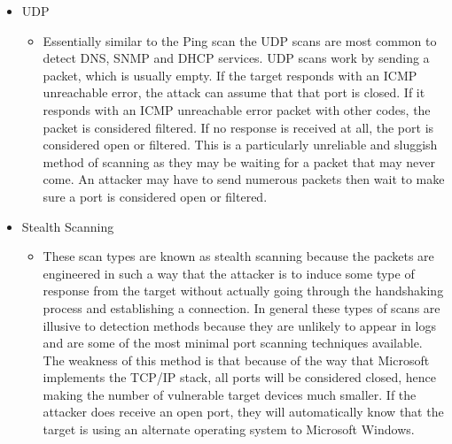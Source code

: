 \begin{itemize}
\begin{itemize}
    \end{itemize}
    \item UDP
    \begin{itemize}
        \item Essentially similar to the Ping scan the UDP scans are most common to detect DNS, SNMP and DHCP services. UDP scans work by sending a packet, which is usually empty. If the target responds with an ICMP unreachable error, the attack can assume that that port is closed. If it responds with an ICMP unreachable error packet with other codes, the packet is considered filtered. If no response is received at all, the port is considered open or filtered. This is a particularly unreliable and sluggish method of scanning as they may be waiting for a packet that may never come. An attacker may have to send numerous packets then wait to make sure a port is considered open or filtered.

    \end{itemize}
    \item Stealth Scanning
    \begin{itemize}
        \item These scan types are known as stealth scanning because the packets are engineered in such a way that the attacker is  to induce some type of response from the target without actually going through the handshaking process and establishing a connection. In general these types of scans are illusive to detection methods because they are unlikely to appear in logs and are some of the most minimal port scanning techniques available. The weakness of this method is that because of the way that Microsoft implements the TCP/IP stack, all ports will be considered closed, hence making the number of vulnerable target devices much smaller. If the attacker does receive an open port, they will automatically know that the target is using an alternate operating system to Microsoft Windows.
    \end{itemize}
\end{itemize}






